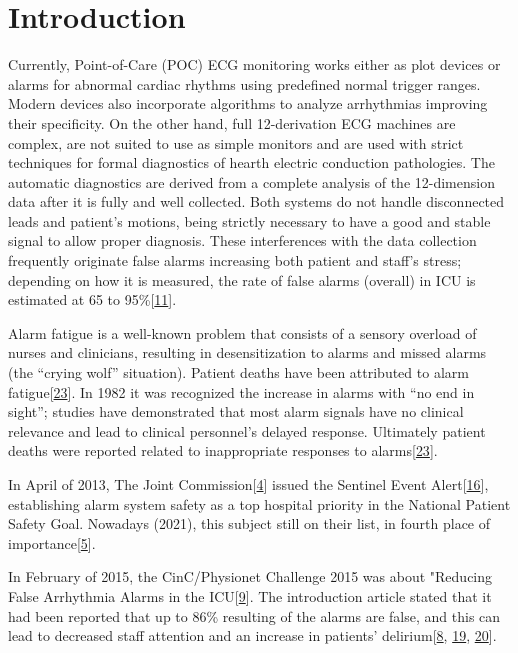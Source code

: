 \documentclass[runningheads]{llncs}
\begin{document}
\hypertarget{introduction}{%
\section{Introduction}\label{introduction}}

Currently, Point-of-Care (POC) ECG monitoring works either as plot
devices or alarms for abnormal cardiac rhythms using predefined normal
trigger ranges. Modern devices also incorporate algorithms to analyze
arrhythmias improving their specificity. On the other hand, full
12-derivation ECG machines are complex, are not suited to use as simple
monitors and are used with strict techniques for formal diagnostics of
hearth electric conduction pathologies. The automatic diagnostics are
derived from a complete analysis of the 12-dimension data after it is
fully and well collected. Both systems do not handle disconnected leads
and patient's motions, being strictly necessary to have a good and
stable signal to allow proper diagnosis. These interferences with the
data collection frequently originate false alarms increasing both
patient and staff's stress; depending on how it is measured, the rate of
false alarms (overall) in ICU is estimated at 65 to
95\%{[}\protect\hyperlink{ref-donchin2002}{11}{]}.

Alarm fatigue is a well-known problem that consists of a sensory
overload of nurses and clinicians, resulting in desensitization to
alarms and missed alarms (the ``crying wolf'' situation). Patient deaths
have been attributed to alarm
fatigue{[}\protect\hyperlink{ref-sendelbach2013}{23}{]}. In 1982 it was
recognized the increase in alarms with ``no end in sight''; studies have
demonstrated that most alarm signals have no clinical relevance and lead
to clinical personnel's delayed response. Ultimately patient deaths were
reported related to inappropriate responses to
alarms{[}\protect\hyperlink{ref-sendelbach2013}{23}{]}.

In April of 2013, The Joint
Commission{[}\protect\hyperlink{ref-the_jc}{4}{]} issued the Sentinel
Event Alert{[}\protect\hyperlink{ref-JointCommission2013}{16}{]},
establishing alarm system safety as a top hospital priority in the
National Patient Safety Goal. Nowadays (2021), this subject still on
their list, in fourth place of
importance{[}\protect\hyperlink{ref-the_jc2021}{5}{]}.

In February of 2015, the CinC/Physionet Challenge 2015 was about
"Reducing False Arrhythmia Alarms in the
ICU{[}\protect\hyperlink{ref-Clifford2015}{9}{]}. The introduction
article stated that it had been reported that up to 86\% resulting of
the alarms are false, and this can lead to decreased staff attention and
an increase in patients'
delirium{[}\protect\hyperlink{ref-Chambrin2001}{8},
\protect\hyperlink{ref-Lawless1994}{19},
\protect\hyperlink{ref-Parthasarathy2004}{20}{]}.
\end{document}
